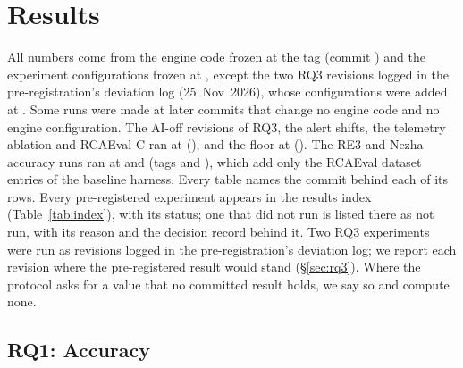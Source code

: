 \section{Results}
\label{sec:results}

All numbers come from the engine code frozen at the tag  (commit ) and the experiment configurations frozen at , except the two RQ3 revisions logged in the pre-registration's deviation log (25~Nov~2026), whose configurations were added at \allowbreak{}.
Some runs were made at later commits that change no engine code and no engine configuration.
The AI-off revisions of RQ3, the alert shifts, the telemetry ablation and RCAEval-C ran at \allowbreak{} (), and the  floor at \allowbreak{} ().
The RE3 and Nezha accuracy runs ran at  and  (tags \allowbreak{} and \allowbreak{}), which add only the RCAEval dataset entries of the baseline harness.
Every table names the commit behind each of its rows.
Every pre-registered experiment appears in the results index (Table~\ref{tab:index}), with its status; one that did not run is listed there as not run, with its reason and the decision record behind it.
Two RQ3 experiments were run as revisions logged in the pre-registration's deviation log; we report each revision where the pre-registered result would stand (\S\ref{sec:rq3}).
Where the protocol asks for a value that no committed result holds, we say so and compute none.

\subsection{RQ1: Accuracy}
\label{sec:rq1}

